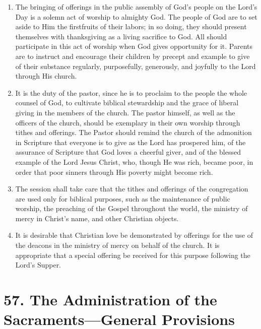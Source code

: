 \documentclass[
]{book}
\providecommand{\tightlist}{%
  \setlength{\itemsep}{0pt}\setlength{\parskip}{0pt}}
\begin{document}
\begin{enumerate}
  \begin{enumerate}
  \def\labelenumii{\alph{enumii}.}
  \tightlist
  \item
    The bringing of offerings in the public assembly of God's people on the Lord's Day is a solemn act of worship to almighty God. The people of God are to set aside to Him the firstfruits of their labors; in so doing, they should present themselves with thanksgiving as a living sacrifice to God. All should participate in this act of worship when God gives opportunity for it. Parents are to instruct and encourage their children by precept and example to give of their substance regularly, purposefully, generously, and joyfully to the Lord through His church.
  \item
    It is the duty of the pastor, since he is to proclaim to the people the whole counsel of God, to cultivate biblical stewardship and the grace of liberal giving in the members of the church. The pastor himself, as well as the officers of the church, should be exemplary in their own worship through tithes and offerings. The Pastor should remind the church of the admonition in Scripture that everyone is to give as the Lord has prospered him, of the assurance of Scripture that God loves a cheerful giver, and of the blessed example of the Lord Jesus Christ, who, though He was rich, became poor, in order that poor sinners through His poverty might become rich.
  \item
    The session shall take care that the tithes and offerings of the congregation are used only for biblical purposes, such as the maintenance of public worship, the preaching of the Gospel throughout the world, the ministry of mercy in Christ's name, and other Christian objects.
  \item
    It is desirable that Christian love be demonstrated by offerings for the use of the deacons in the ministry of mercy on behalf of the church. It is appropriate that a special offering be received for this purpose following the Lord's Supper.
  \end{enumerate}
\end{enumerate}

\hypertarget{the-administration-of-the-sacramentsgeneral-provisions}{%
\section*{57. The Administration of the Sacraments---General Provisions}\label{the-administration-of-the-sacramentsgeneral-provisions}}
\end{document}
